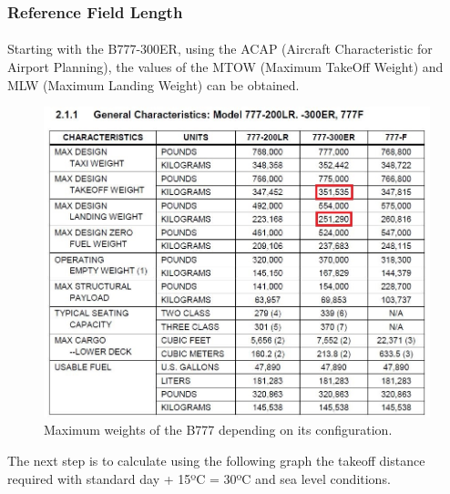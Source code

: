 			\subsubsection{Reference Field Length}
			\paragraph{}Starting with the B777-300ER, using the ACAP (Aircraft Characteristic for Airport Planning), the values of the MTOW (Maximum TakeOff Weight) and MLW (Maximum Landing Weight) can be obtained. 
			
			\begin{figure}[H]
				\centering
				\includegraphics[clip, trim=0cm 0cm 0cm 0cm, width=1\textwidth]{./images/B777/B777MTOW}
				\caption{Maximum weights of the B777 depending on its configuration.} %
				\label{} %
			\end{figure}

			The next step is to calculate using the following graph the takeoff distance required with standard day + 15ºC = 30ºC and sea level conditions.
			
